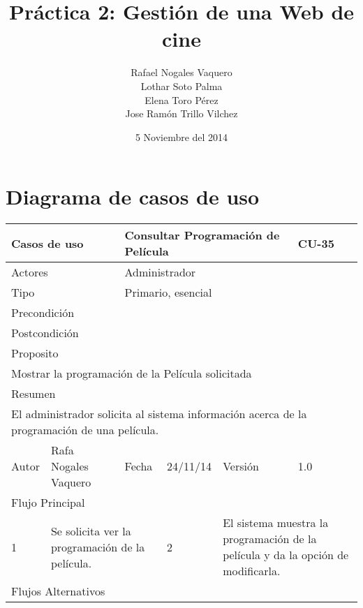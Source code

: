 \documentclass{article}
\title{Práctica 2: Gestión de una Web de cine}
\author{Rafael Nogales Vaquero
\\Lothar Soto Palma
\\Elena Toro Pérez
\\Jose Ramón Trillo Vilchez}
\date{5 Noviembre del 2014}
\begin{document}
\maketitle
\section{Diagrama de casos de uso}




%
\begin{table}[h]
\begin{tabular}{|l|l|l|l|l|l|}
\hline
\multicolumn{2}{|p{2cm}|}{Casos de uso}  & \multicolumn{3}{p{7cm}|}{Consultar Programación de Película} & CU-35 \\
\hline
\multicolumn{2}{|p{2cm}|}{Actores}       & \multicolumn{4}{p{8cm}|}{Administrador}        \\
\hline
\multicolumn{2}{|p{2cm}|}{Tipo}          & \multicolumn{4}{p{8cm}|}{Primario, esencial}        \\
\hline
\multicolumn{2}{|p{2cm}|}{Precondición}  & \multicolumn{4}{p{8cm}|}{}        \\
\hline
\multicolumn{2}{|p{2cm}|}{Postcondición} & \multicolumn{4}{p{8cm}|}{}        \\
\hline
\multicolumn{6}{|p{10cm}|}{Proposito}                                   \\
\hline
\multicolumn{6}{|p{10cm}|}{Mostrar la programación de la Película solicitada}                                            \\
\hline
\multicolumn{6}{|p{10cm}|}{Resumen}                                 \\
\hline
\multicolumn{6}{|p{10cm}|}{El administrador solicita al sistema información acerca de la programación de una película.}                                            \\
\hline
Autor         &       Rafa Nogales Vaquero        &  Fecha   &  24/11/14   &   Versión  & 1.0\\
\hline
\multicolumn{6}{|p{10cm}|}{Flujo Principal}\\
\hline
\multicolumn{1}{|p{1cm}|}{1} & \multicolumn{2}{p{3cm}}{Se solicita ver la programación de la película.} & \multicolumn{1}{|p{1cm}|}{2} & \multicolumn{2}{p{3cm}|}{El sistema muestra la programación de la película y da la opción de modificarla.}\\
\hline
\multicolumn{6}{|p{10cm}|}{Flujos Alternativos}\\

\end{tabular}
\end{table}
\end{document}
